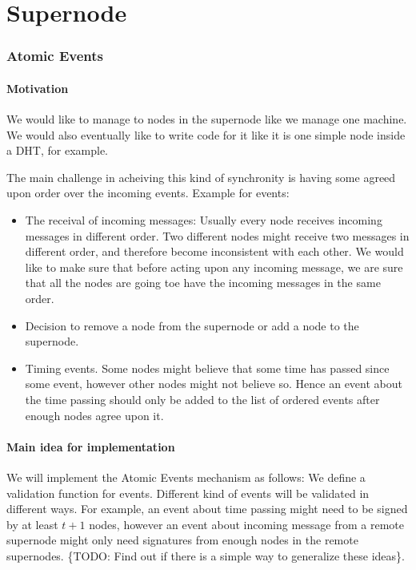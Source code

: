 \part{Supernode}

\section{Atomic Events}

\subsection{Motivation}

We would like to manage to nodes in the supernode like we manage one machine. We
would also eventually like to write code for it like it is one simple node
inside a DHT, for example.

The main challenge in acheiving this kind of synchronity is having some agreed
upon order over the incoming events. Example for events:
\begin{itemize}
  \item The receival of incoming messages: Usually every node receives incoming
    messages in different order. Two different nodes might receive two messages
    in different order, and therefore become inconsistent with each other. We
    would like to make sure that before acting upon any incoming message, we are
    sure that all the nodes are going toe have the incoming messages in the same
    order.

  \item Decision to remove a node from the supernode or add a node to the
    supernode.

  \item Timing events. Some nodes might believe that some time has passed since
    some event, however other nodes might not believe so. Hence an event about
    the time passing should only be added to the list of ordered events after
    enough nodes agree upon it.
\end{itemize}

\subsection{Main idea for implementation}

We will implement the Atomic Events mechanism as follows: We define a validation
function for events. Different kind of events will be validated in different
ways. For example, an event about time passing might need to be signed by at
least $t+1$ nodes, however an event about incoming message from a remote
supernode might only need signatures from enough nodes in the remote supernodes.
\{TODO: Find out if there is a simple way to generalize these ideas\}.

